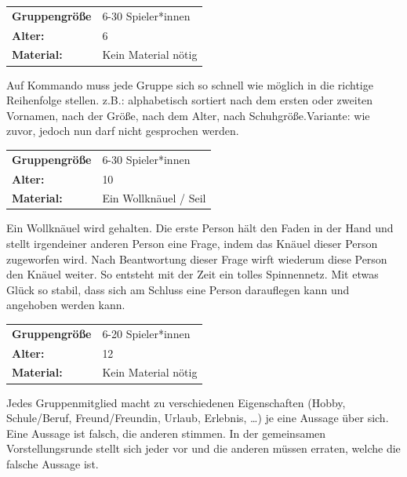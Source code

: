 \begin{table}[H]
\begin{tabular}{>{\bfseries}lp{8cm}}
   Gruppengröße   & 6-30 Spieler*innen\\
    Alter: & 6 \\
    Material: & Kein Material nötig\\
\end{tabular}
\end{table} 
 Auf Kommando muss jede Gruppe sich so schnell wie möglich in die richtige Reihenfolge stellen. z.B.: alphabetisch sortiert nach dem ersten oder zweiten Vornamen, nach der Größe, nach dem Alter, nach Schuhgröße.Variante: wie  zuvor,  jedoch  nun  darf  nicht  gesprochen werden.\\



\begin{table}[H]
\begin{tabular}{>{\bfseries}lp{8cm}}
   Gruppengröße   & 6-30 Spieler*innen\\
    Alter: & 10 \\
    Material: & Ein Wollknäuel / Seil \\
\end{tabular}
\end{table} 
 Ein Wollknäuel wird gehalten. Die erste Person hält den Faden in der Hand und stellt irgendeiner anderen Person eine Frage, indem das Knäuel dieser Person zugeworfen wird. Nach Beantwortung dieser Frage wirft wiederum diese Person den Knäuel weiter. So entsteht mit der Zeit ein tolles Spinnennetz. Mit etwas Glück so stabil, dass sich am Schluss eine Person darauflegen kann und angehoben werden kann.
 \\


\begin{table}[H]
\begin{tabular}{>{\bfseries}lp{8cm}}
   Gruppengröße   & 6-20 Spieler*innen\\
    Alter: & 12 \\
    Material: & Kein Material nötig \\
\end{tabular}
\end{table} 
Jedes Gruppenmitglied macht zu verschiedenen Eigenschaften (Hobby, Schule/Beruf, Freund/Freundin, Urlaub, Erlebnis, …) je eine Aussage über sich. Eine Aussage ist falsch, die anderen stimmen. In der gemeinsamen Vorstellungsrunde stellt sich jeder vor und die anderen müssen erraten, welche die falsche Aussage ist.  \\


